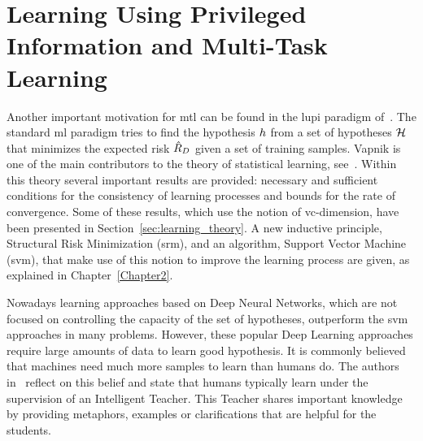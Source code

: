 \section{Learning Using Privileged Information and Multi-Task Learning}\label{sec:ch3_lupi}
Another important motivation for \acrshort{mtl} can be found in the \acrfull{lupi} paradigm of~\cite{VapnikI15a}.
The standard \acrshort{ml} paradigm tries to find the hypothesis $h$ from a set of hypotheses $\mathcal{H}$ that minimizes the expected risk $\hat{R}_{D}$ given a set of training samples.
Vapnik is one of the main contributors to the theory of statistical learning, see~\cite{Vapnik00}. Within this theory several important results are provided: necessary and sufficient conditions for the consistency of learning processes and bounds for the rate of convergence. Some of these results, which use the notion of \acrshort{vc}-dimension, have been presented in Section~\ref{sec:learning_theory}. A new inductive principle, Structural Risk Minimization (\acrshort{srm}), and an algorithm, Support Vector Machine (\acrshort{svm}), that make use of this notion to improve the learning process are given, as explained in Chapter~\ref{Chapter2}.

Nowadays learning approaches based on Deep Neural Networks, which are not focused on controlling the capacity of the set of hypotheses, outperform the \acrshort{svm} approaches in many problems. However, these popular Deep Learning approaches require large amounts of data to learn good hypothesis.
It is commonly believed that machines need much more samples to learn than humans do. The authors in~\citet{VapnikV09, VapnikI15a} reflect on this belief and state that humans typically learn under the supervision of an Intelligent Teacher.
This Teacher shares important knowledge by providing metaphors, examples or clarifications that are helpful for the students.



